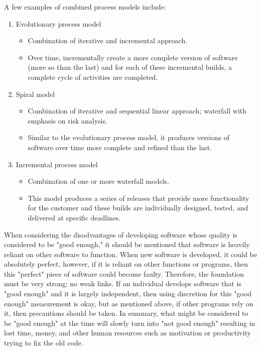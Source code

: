 	A few examples of combined process models include:
	\begin{enumerate}
		\item Evolutionary process model
			\begin{itemize}
				\item Combination of iterative and incremental approach.
				\item Over time, incrementally create a more complete version of software (more so than the last) and for each of these incremental builds, a complete cycle of activities are completed.
			\end{itemize}
		\item Spiral model
			\begin{itemize}
				\item Combination of iterative and sequential linear approach; waterfall with emphasis on risk analysis.
				\item Similar to the evolutionary process model, it produces versions of software over time more complete and refined than the last.
			\end{itemize}
		\item Incremental process model
			\begin{itemize}
				\item Combination of one or more waterfall models.
				\item This model produces a series of releases that provide more functionality for the customer and these builds are individually designed, tested, and delivered at specific deadlines.
			\end{itemize}
	\end{enumerate}


\newpage
{}
	When considering the disadvantages of developing software whose quality is considered to be "good enough," it should be mentioned that software is heavily reliant on other software to function. When new software is developed, it could be absolutely perfect, however, if it is reliant on other functions or programs, then this "perfect" piece of software could become faulty. Therefore, the foundation must be very strong; no weak links. If an individual develops software that is "good enough" and it is largely independent, then using discretion for this "good enough" measurement is okay, but as mentioned above, if other programs rely on it, then precautions should be taken. In summary, what might be considered to be "good enough" at the time will slowly turn into "not good enough" resulting in lost time, money, and other human resources such as motivation or productivity trying to fix the old code.

